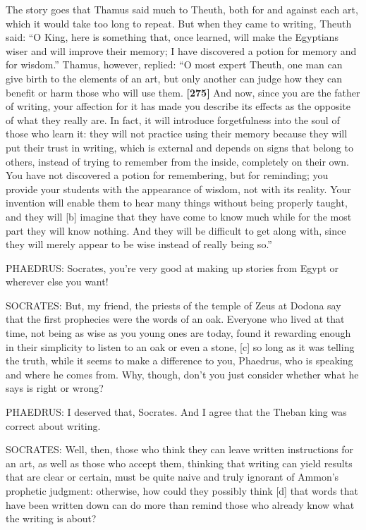 The story goes that Thamus said much to Theuth, both for and against
each art, which it would take too long to repeat. But when they came to
writing, Theuth said: “O King, here is something that, once learned,
will make the Egyptians wiser and will improve their memory; I have
discovered a potion for memory and for wisdom.” Thamus, however,
replied: “O most expert Theuth, one man can give birth to the elements
of an art, but only another can judge how they can benefit or harm those
who will use them. {\bf {[}275{]}} And now, since you are the father of
writing, your affection for it has made you describe its effects as the
opposite of what they really are. In fact, it will introduce
forgetfulness into the soul of those who learn it: they will not
practice using their memory because they will put their trust in
writing, which is external and depends on signs that belong to others,
instead of trying to remember from the inside, completely on their own.
You have not discovered a potion for remembering, but for reminding; you
provide your students with the appearance of wisdom, not with its
reality. Your invention will enable them to hear many things without
being properly taught, and they will {[}b{]} imagine that they have come
to know much while for the most part they will know nothing. And they
will be difficult to get along with, since they will merely appear to be
wise instead of really being so.”

PHAEDRUS: Socrates, you're very good at making up stories from Egypt or
wherever else you want!

SOCRATES: But, my friend, the priests of the temple of Zeus at Dodona
say that the first prophecies were the words of an oak. Everyone who
lived at that time, not being as wise as you young ones are today, found
it rewarding enough in their simplicity to listen to an oak or even a
stone, {[}c{]} so long as it was telling the truth, while it seems to
make a difference to you, Phaedrus, who is speaking and where he comes
from. Why, though, don't you just consider whether what he says is right
or wrong?

PHAEDRUS: I deserved that, Socrates. And I agree that the Theban king
was correct about writing.

SOCRATES: Well, then, those who think they can leave written
instructions for an art, as well as those who accept them, thinking that
writing can yield results that are clear or certain, must be quite naive
and truly ignorant of Ammon's prophetic judgment: otherwise, how could
they possibly think {[}d{]} that words that have been written down can
do more than remind those who already know what the writing is about?

